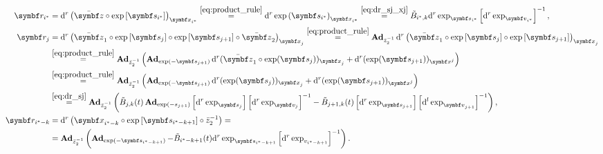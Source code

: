 \begin{equation*}
  \begin{aligned}
    \symbf r_{i^*}
                         & = \mathrm{d}^r \left( \bar \z \circ \exp \left[ \symbf s_{i^*} \right] \right)_{\x_{i^*}}
    \overset{\eqref{eq:product_rule}}= \mathrm{d}^r \exp\left( \symbf s_{i^*} \right)_{\x_{i^*}} \overset{\eqref{eq:dr_sj_xj}}=  \tilde B_{i^*, k} \mathrm{d}^r \exp_{\symbf s_{i^*}} \left[ \mathrm{d}^r \exp_{\bv_{i^*}} \right]^{-1},                                                                                                                         \\
    \symbf r_{j}
                         & = \mathrm{d}^r \left( \bar \z_1 \circ \exp \left[ \symbf s_{j} \right]\circ \exp \left[ \symbf s_{j+1} \right] \circ \bar \z_2 \right)_{\x_j}
    \overset{\eqref{eq:product_rule}}= \bAd_{\bar z_2^{-1}} \mathrm{d}^r \left( \bar \z_1 \circ \exp \left[ \symbf s_{j} \right]\circ \exp \left[ \symbf s_{j+1} \right] \right)_{\x_j}                                                                                                                                                                          \\
                         & \overset{\eqref{eq:product_rule}}= \bAd_{\bar z_2^{-1}} \left( \bAd_{\exp(-\symbf s_{j+1})} \mathrm{d}^r (\bar \z_1 \circ \exp(\symbf s_j))_{\x_j} + \mathrm{d}^r (\exp(\symbf s_{j+1}))_{\x^j}  \right)                                                                                                                              \\
                         & \overset{\eqref{eq:product_rule}}= \bAd_{\bar z_2^{-1}} \left( \bAd_{\exp(-\symbf s_{j+1})} \mathrm{d}^r (\exp(\symbf s_j))_{\x_j} + \mathrm{d}^r (\exp(\symbf s_{j+1}))_{\x^j}  \right)                                                                                                                                              \\
                         & \overset{\eqref{eq:dr_sj}}= \bAd_{\bar z_2^{-1}} \left( \tilde B_{j, k}(t) \bAd_{\exp(-s_{j+1})} \left[ \mathrm{d}^r \exp_{\symbf s_j} \right] \left[ \mathrm{d}^r \exp_{\symbf v_j} \right]^{-1} - \tilde B_{j+1, k}(t) \left[ \mathrm{d}^r \exp_{\symbf s_{j+1}} \right] \left[ \mathrm{d}^l \exp_{\bv_{j+1}} \right]^{-1} \right), \\
    \symbf r_{i^{*} - k} & = \mathrm{d}^{r} \left( \x_{i^{*} - k} \circ \exp \left[ \symbf s_{i^{*}-k+1} \right] \circ \bar z_{2}^{-1} \right) =                                                                                                                                                                                                                 \\
                         & = \bAd_{\bar z_{2}^{-1}} \left( \bAd_{\exp(-\symbf s_{i^{*} - k + 1})} - \tilde B_{i^{*} - k + 1}(t) \mathrm{d}^{r} \exp_{\symbf s_{i^{*} - k + 1}} \left[ \mathrm{d}^{r} \exp_{v_{i^{*} - k + 1}} \right]^{-1} \right).
  \end{aligned}
\end{equation*}


